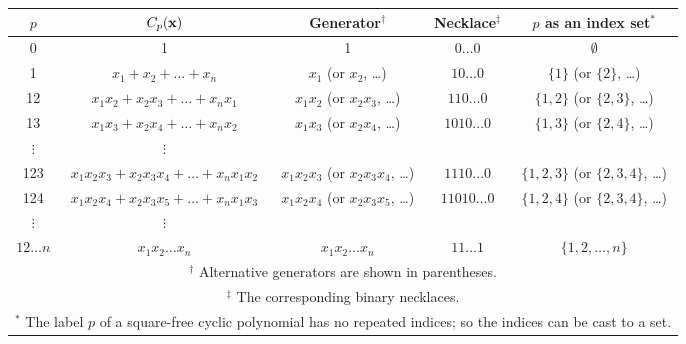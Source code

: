 \documentclass{ws-ijbc}
\begin{document}
\begin{table}[h]\footnotesize
{}
{
\begin{tabular}{c c c c c}
\hline
$p$ & $C_p(\mathbf{x})$ & Generator$^\dagger$ & Necklace$^\ddagger$ & $p$ as an index set$^*$\\
\hline
0             & 1 & 1 & $0\ldots0$ & $\emptyset$ \\
1             & $x_1 + x_2 + \dots + x_n$
              & $x_1$ (or $x_2$, \ldots)
              & $10\ldots0$
              & $\{1\}$ (or $\{2\}$, \ldots) \\
12            & $x_1 x_2 + x_2 x_3 + \dots + x_n x_1$
              & $x_1 x_2$ (or $x_2 x_3$, \ldots)
              & $110\ldots0$
              & $\{1, 2\}$ (or $\{2, 3\}$, \ldots) \\
13            & $x_1 x_3 + x_2 x_4 + \dots + x_n x_2$
              & $x_1 x_3$ (or $x_2 x_4$, \ldots)
              & $1010\ldots0$
              & $\{1, 3\}$ (or $\{2, 4\}$, \ldots) \\
$\vdots$      & $\vdots$ \\
123           & \hspace{1mm}$x_1 x_2 x_3 + x_2 x_3 x_4 + \dots + x_n x_1 x_2$\hspace{1mm}
              & \hspace{1mm}$x_1 x_2 x_3$ (or $x_2 x_3 x_4$, \ldots)\hspace{1mm}
              & $1110\ldots0$
              & $\{1, 2, 3\}$ (or $\{2, 3, 4\}$, \ldots) \\
124           & $x_1 x_2 x_4 + x_2 x_3 x_5 + \dots + x_n x_1 x_3$
              & $x_1 x_2 x_4$ (or $x_2 x_3 x_5$, \ldots)
              & $11010\ldots0$
              & $\{1, 2, 4\}$ (or $\{2, 3, 4\}$, \ldots) \\
$\vdots$      & $\vdots$ \\
$12\dots n$  & $x_1 x_2 \dots x_n$
              & $x_1 x_2 \dots x_n$
              & $11\ldots1$
              & $\{1, 2, \ldots, n\}$  \\
\hline
\multicolumn{5}{p{\linewidth}}{
$^\dagger$ Alternative generators are shown in parentheses.
}\\
\multicolumn{5}{p{\linewidth}}{
$^\ddagger$ The corresponding binary necklaces.
}\\
\multicolumn{5}{p{\linewidth}}{
$^*$ The label $p$ of a square-free cyclic polynomial
    has no repeated indices;
    so the indices can be cast to a set.
}\\
\hline
\end{tabular}
\label{tab:sqrfreepoly}
}
\end{table}
\end{document}
